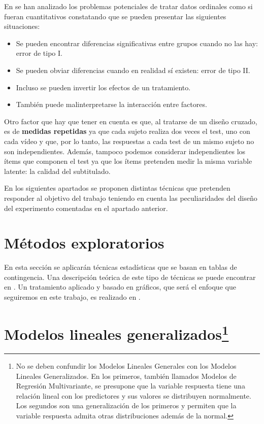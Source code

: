 \documentclass[
  12pt,
  a4paper,
  extrafontsizes,
  onecolumn,
  openright,
  table]{memoir}
\providecommand{\tightlist}{%
  \setlength{\itemsep}{0pt}\setlength{\parskip}{0pt}}\usepackage{longtable,booktabs,array}
\begin{document}
En \textcite{kruschke2018} se han analizado los problemas potenciales de
tratar datos ordinales como si fueran cuantitativos constatando que se
pueden presentar las siguientes situaciones:

\begin{itemize}
\tightlist
\item
  Se pueden encontrar diferencias significativas entre grupos cuando no
  las hay: error de tipo I.
\item
  Se pueden obviar diferencias cuando en realidad sí existen: error de
  tipo II.
\item
  Incluso se pueden invertir los efectos de un tratamiento.
\item
  También puede malinterpretarse la interacción entre factores.
\end{itemize}

Otro factor que hay que tener en cuenta es que, al tratarse de un diseño
cruzado, es de \textbf{medidas repetidas} ya que cada sujeto realiza dos
veces el test, uno con cada vídeo y que, por lo tanto, las respuestas a
cada test de un mismo sujeto no son independientes. Además, tampoco
podemos considerar independientes los ítems que componen el test ya que
los ítems pretenden medir la misma variable latente: la calidad del
subtitulado.

En los siguientes apartados se proponen distintas técnicas que pretenden
responder al objetivo del trabajo teniendo en cuenta las peculiaridades
del diseño del experimento comentadas en el apartado anterior.

\hypertarget{muxe9todos-exploratorios}{%
\section{Métodos exploratorios}\label{muxe9todos-exploratorios}}

En esta sección se aplicarán técnicas estadísticas que se basan en
tablas de contingencia. Una descripción teórica de este tipo de técnicas
se puede encontrar en \textcite{agresti_2018}. Un tratamiento aplicado y
basado en gráficos, que será el enfoque que seguiremos en este trabajo,
es realizado en \textcite{frienly2015}.

\hypertarget{sec-glm}{%
\section[Modelos lineales generalizados]{\texorpdfstring{Modelos
lineales
generalizados\footnote{No se deben confundir los Modelos Lineales
  Generales con los Modelos Lineales Generalizados. En los primeros,
  también llamados Modelos de Regresión Multivariante, se presupone que
  la variable respuesta tiene una relación lineal con los predictores y
  sus valores se distribuyen normalmente. Los segundos son una
  generalización de los primeros y permiten que la variable respuesta
  admita otras distribuciones además de la normal.}}{Modelos lineales generalizados}}\label{sec-glm}}
\end{document}
